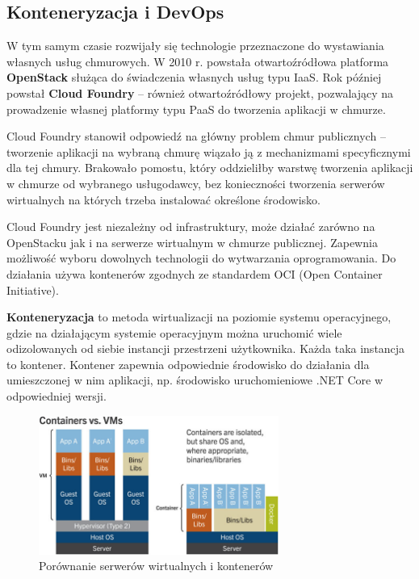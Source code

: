 \documentclass[12pt,a4paper,twoside,titlepage,openright]{book}
\begin{document}
\subsection{Konteneryzacja i DevOps} \label{section:konteneryzacja}

W tym samym czasie rozwijały się technologie przeznaczone do wystawiania własnych usług chmurowych. W 2010 r. powstała otwartoźródłowa platforma \textbf{OpenStack} służąca do świadczenia własnych usług typu IaaS. Rok później powstał \textbf{Cloud Foundry} -- również otwartoźródłowy projekt, pozwalający na prowadzenie własnej platformy typu PaaS do tworzenia aplikacji w chmurze. 

Cloud Foundry stanowił odpowiedź na główny problem chmur publicznych -- tworzenie aplikacji na wybraną chmurę wiązało ją z mechanizmami specyficznymi dla tej chmury. Brakowało pomostu, który oddzieliłby warstwę tworzenia aplikacji w chmurze od wybranego usługodawcy, bez konieczności tworzenia serwerów wirtualnych na których trzeba instalować określone środowisko. \cite{cloudFoundry}

Cloud Foundry jest niezależny od infrastruktury, może działać zarówno na OpenStacku jak i na serwerze wirtualnym w chmurze publicznej. Zapewnia możliwość wyboru dowolnych technologii do wytwarzania oprogramowania. Do działania używa kontenerów zgodnych ze standardem OCI (Open Container Initiative). \cite{cloudFoundry} 

\textbf{Konteneryzacja} to metoda wirtualizacji na poziomie systemu operacyjnego, gdzie na działającym systemie operacyjnym można uruchomić wiele odizolowanych od siebie instancji przestrzeni użytkownika. Każda taka instancja to kontener. Kontener zapewnia odpowiednie środowisko do działania dla umieszczonej w nim aplikacji, np. środowisko uruchomieniowe .NET Core w odpowiedniej wersji.  \cite{cloudFoundry,ccSpringer}

\begin{figure}[h]
	\centering
			\includegraphics[width=0.7\textwidth]{containers-vs-vms.png}
		\caption{Porównanie serwerów wirtualnych i kontenerów \cite{ccSpringer}}
		\label{fig:containers-vs-vms}
\end{figure}
\end{document}
